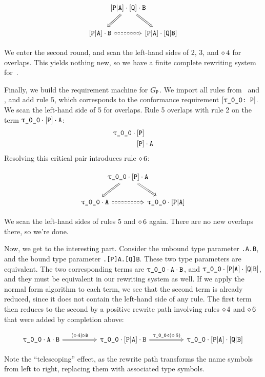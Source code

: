 \documentclass[../generics]{subfiles}
\begin{document}
\begin{example}
\begin{ceqn}
\[
\begin{tikzcd}[column sep=-1em]
& \aPA \cdot \pQ \cdot \nB
\arrow[ld, Rightarrow]
\arrow[rd, Rightarrow] \\
\aPA \cdot \nB\arrow[rr, Rightarrow, dashed] && \aPA \cdot \aQB
\end{tikzcd}
\]
\end{ceqn}
We enter the second round, and scan the left-hand sides of 2, 3, and $\diamond\, 4$ for overlaps. This yields nothing new, so we have a finite complete rewriting system for~\tP.

Finally, we build the requirement machine for $G_{\texttt{P}}$. We import all rules from \tQ\ and \tP, and add rule 5, which corresponds to the conformance requirement $\ConfReq{\rT}{P}$. We scan the left-hand side of 5 for overlaps. Rule 5 overlaps with rule 2 on the term
$\rT\cdot\pP\cdot\nA$:
\begin{align*}
\rT\cdot{}&\pP\\
&\pP\cdot\nA
\end{align*}
Resolving this critical pair introduces rule $\diamond\, 6$:
\begin{ceqn}
\[
\begin{tikzcd}[column sep=-1em]
& \rT \cdot \pP \cdot \nA
\arrow[ld, Rightarrow]
\arrow[rd, Rightarrow] \\
\rT \cdot \nA\arrow[rr, Rightarrow, dashed] && \rT \cdot \aPA
\end{tikzcd}
\]
\end{ceqn}
We scan the left-hand sides of rules 5 and $\diamond\, 6$ again. There are no new overlaps there, so we're done.

Now, we get to the interesting part. Consider the unbound type parameter \texttt{\rT.A.B}, and the bound type parameter \texttt{\rT.[P]A.[Q]B}. These two type parameters are equivalent. The two corresponding terms are $\rT\cdot\nA\cdot\nB$, and $\rT\cdot\aPA\cdot\aQB$, and they must be equivalent in our rewriting system as well. If we apply the normal form algorithm to each term, we see that the second term is already reduced, since it does not contain the left-hand side of any rule. The first term then reduces to the second by a positive rewrite path involving rules $\diamond\, 4$ and $\diamond\, 6$ that were added by completion above:
\begin{ceqn}
\[
\begin{tikzcd}[column sep=huge]
\rT\cdot\nA\cdot\nB\arrow[r, Rightarrow, "(\CRule{4}) \WR \nB"]&
\rT\cdot\aPA\cdot\nB\arrow[r, Rightarrow, "\rT \WL (\CRule{6})"]&
\rT\cdot\aPA\cdot\aQB
\end{tikzcd}
\]
\end{ceqn}
Note the ``telescoping'' effect, as the rewrite path transforms the name symbols from left to right, replacing them with associated type symbols.


\end{example}
\end{document}
